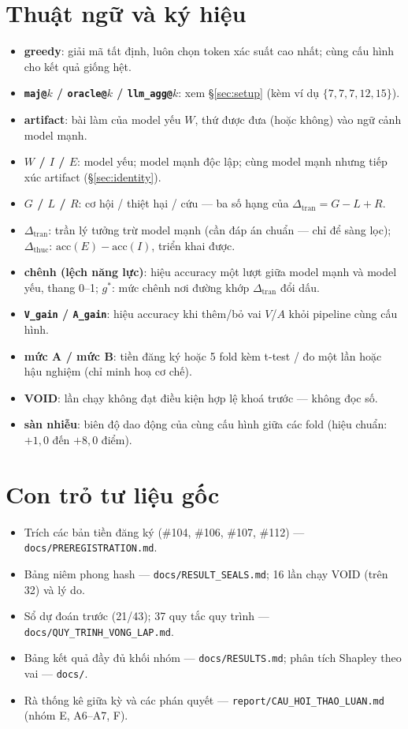 \documentclass[11pt,a4paper]{article}
\newcommand{\dceil}{\Delta_{\mathrm{tran}}}
\newcommand{\dhonest}{\Delta_{\mathrm{thuc}}}
\newcommand{\acc}{\mathrm{acc}}
\begin{document}
\appendix
\section{Thuật ngữ và ký hiệu}\label{app:glossary}
\begin{itemize}\itemsep1pt
\item[] \textbf{greedy}: giải mã tất định, luôn chọn token xác suất cao nhất; cùng cấu hình cho
kết quả giống hệt.
\item[] \textbf{\texttt{maj@}$k$ / \texttt{oracle@}$k$ / \texttt{llm\_agg@}$k$}: xem
\S\ref{sec:setup} (kèm ví dụ $\{7,7,7,12,15\}$).
\item[] \textbf{artifact}: bài làm của model yếu $W$, thứ được đưa (hoặc không) vào ngữ cảnh
model mạnh.
\item[] \textbf{$W$ / $I$ / $E$}: model yếu; model mạnh độc lập; cùng model mạnh nhưng tiếp xúc
artifact (\S\ref{sec:identity}).
\item[] \textbf{$G$ / $L$ / $R$}: cơ hội / thiệt hại / cứu --- ba số hạng của
$\dceil = G - L + R$.
\item[] \textbf{$\dceil$}: trần lý tưởng trừ model mạnh (cần đáp án chuẩn --- chỉ để sàng lọc);
\textbf{$\dhonest$}: $\acc(E)-\acc(I)$, triển khai được.
\item[] \textbf{chênh (lệch năng lực)}: hiệu accuracy một lượt giữa model mạnh và model yếu,
thang 0--1; \textbf{$g^\ast$}: mức chênh nơi đường khớp $\dceil$ đổi dấu.
\item[] \textbf{\texttt{V\_gain} / \texttt{A\_gain}}: hiệu accuracy khi thêm/bỏ vai $V$/$A$
khỏi pipeline cùng cấu hình.
\item[] \textbf{mức A / mức B}: tiền đăng ký hoặc 5 fold kèm t-test / đo một lần hoặc hậu
nghiệm (chỉ minh hoạ cơ chế).
\item[] \textbf{VOID}: lần chạy không đạt điều kiện hợp lệ khoá trước --- không đọc số.
\item[] \textbf{sàn nhiễu}: biên độ dao động của cùng cấu hình giữa các fold (hiệu chuẩn:
$+1{,}0$ đến $+8{,}0$ điểm).
\end{itemize}

\section{Con trỏ tư liệu gốc}
\begin{itemize}\itemsep1pt
\item[\textbf{B.}] Trích các bản tiền đăng ký (\#104, \#106, \#107, \#112) --- \texttt{docs/PREREGISTRATION.md}.
\item[\textbf{C.}] Bảng niêm phong hash --- \texttt{docs/RESULT\_SEALS.md}; 16 lần chạy VOID (trên 32) và lý do.
\item[\textbf{D.}] Sổ dự đoán trước (21/43); 37 quy tắc quy trình --- \texttt{docs/QUY\_TRINH\_VONG\_LAP.md}.
\item[\textbf{E.}] Bảng kết quả đầy đủ khối nhóm --- \texttt{docs/RESULTS.md}; phân tích Shapley theo vai --- \texttt{docs/}.
\item[\textbf{F.}] Rà thống kê giữa kỳ và các phán quyết --- \texttt{report/CAU\_HOI\_THAO\_LUAN.md} (nhóm E, A6--A7, F).
\end{itemize}
\end{document}
